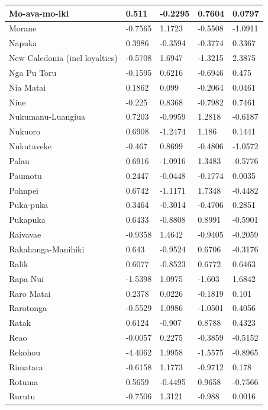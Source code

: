\documentclass[a4paper,10pt]{article} %
\begin{document}
\begin{landscape}
\begin{longtable}{| p{2.6cm} |  p{2cm} | p{2cm}  | p{2cm}  | p{2cm}|}
 Mo-ava-mo-iki & 0.511 & -0.2295 & 0.7604 & 0.0797 \\ \hline
 Morane & -0.7565 & 1.1723 & -0.5508 & -1.0911 \\ \hline
 Napuka & 0.3986 & -0.3594 & -0.3774 & 0.3367 \\ \hline
 New Caledonia (incl loyalties) & -0.5708 & 1.6947 & -1.3215 & 2.3875 \\ \hline
 Nga Pu Toru & -0.1595 & 0.6216 & -0.6946 & 0.475 \\ \hline
 Nia Matai & 0.1862 & 0.099 & -0.2064 & 0.0461 \\ \hline
 Niue & -0.225 & 0.8368 & -0.7982 & 0.7461 \\ \hline
 Nukumanu-Luangiua & 0.7203 & -0.9959 & 1.2818 & -0.6187 \\ \hline
 Nukuoro & 0.6908 & -1.2474 & 1.186 & 0.1441 \\ \hline
 Nukutaveke & -0.467 & 0.8699 & -0.4806 & -1.0572 \\ \hline
 Palau & 0.6916 & -1.0916 & 1.3483 & -0.5776 \\ \hline
 Paumotu & 0.2447 & -0.0448 & -0.1774 & 0.0035 \\ \hline
 Pohnpei & 0.6742 & -1.1171 & 1.7348 & -0.4482 \\ \hline
 Puka-puka & 0.3464 & -0.3014 & -0.4706 & 0.2851 \\ \hline
 Pukapuka & 0.6433 & -0.8808 & 0.8991 & -0.5901 \\ \hline
 Raivavae & -0.9358 & 1.4642 & -0.9405 & -0.2059 \\ \hline
 Rakahanga-Manihiki & 0.643 & -0.9524 & 0.6706 & -0.3176 \\ \hline
 Ralik & 0.6077 & -0.8523 & 0.6772 & 0.6463 \\ \hline
 Rapa Nui & -1.5398 & 1.0975 & -1.603 & 1.6842 \\ \hline
 Raro Matai & 0.2378 & 0.0226 & -0.1819 & 0.101 \\ \hline
 Rarotonga & -0.5529 & 1.0986 & -1.0501 & 0.4056 \\ \hline
 Ratak & 0.6124 & -0.907 & 0.8788 & 0.4323 \\ \hline
 Reao & -0.0057 & 0.2275 & -0.3859 & -0.5152 \\ \hline
 Rekohou & -4.4062 & 1.9958 & -1.5575 & -0.8965 \\ \hline
 Rimatara & -0.6158 & 1.1773 & -0.9712 & 0.178 \\ \hline
 Rotuma & 0.5659 & -0.4495 & 0.9658 & -0.7566 \\ \hline
 Rurutu & -0.7506 & 1.3121 & -0.988 & 0.0016 \\ \hline

\end{longtable}
\end{landscape}
\end{document}
